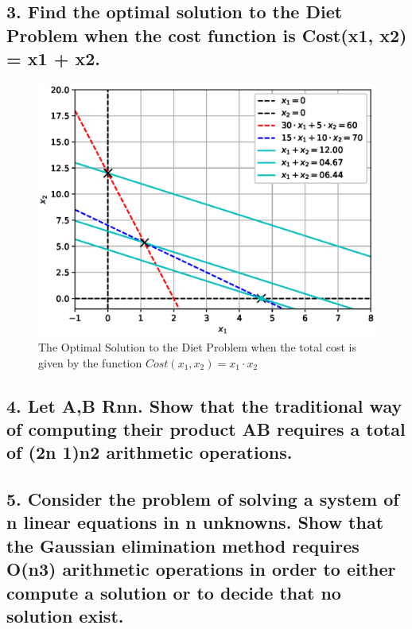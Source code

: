 \documentclass[12pt]{article}
\begin{document}
\pagebreak

\subsection*{3. Find the optimal solution to the Diet Problem when the cost function is
Cost(x1, x2) = x1 + x2.}

\begin{figure}[hp]
    \centering
    \captionsetup{justification=centering}

    \includegraphics{diet_problem_figure}
    \caption{The Optimal Solution to the Diet Problem when the total cost is given by the function $Cost(x_1, x_2) = x_1 \cdot x_2$}
\end{figure}

\vspace{2in}


\pagebreak

\subsection*{4. Let A,B Rnn. Show that the traditional way of computing their product AB requires
a total of (2n 1)n2 arithmetic operations.}

\vspace{2in}


\pagebreak

\subsection*{5. Consider the problem of solving a system of n linear equations in n unknowns. Show
that the Gaussian elimination method requires O(n3) arithmetic operations in order to either
compute a solution or to decide that no solution exist.}
\end{document}
